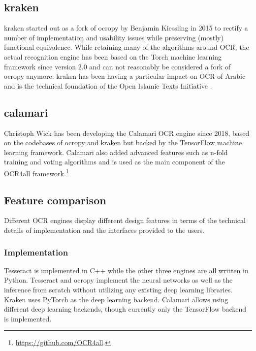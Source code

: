 \documentclass[conference]{IEEEtran}
\begin{document}
\subsection{kraken}

kraken \cite{DBLP:journals/corr/RomanovMSK17} started out as a fork of ocropy
by Benjamin Kiessling in 2015 to rectify a number of implementation and usability
issues while preserving (mostly) functional equivalence. While retaining many of
the algorithms around OCR, the actual recognition engine has been based on the
Torch machine learning framework since version 2.0 and can not reasonably be
considered a fork of ocropy anymore. kraken has been having a particular impact
on OCR of Arabic and is the technical foundation of the Open Islamic Texts
Initiative \cite{miller_romanov_savant_2018}.


\subsection{calamari}

Christoph Wick has been developing the Calamari
\cite{DBLP:journals/corr/abs-1807-02004} OCR engine since 2018, based on the
codebases of ocropy and kraken but backed by the TensorFlow machine learning
framework. Calamari also added advanced features such as n-fold training and
voting algorithms and is used as the main component of the OCR4all
framework.\footnote{\url{https://github.com/OCR4all}.}

\subsection{Feature comparison}


Different OCR engines display different design features in terms of the
technical details of implementation and the interfaces provided to the users.

\subsubsection{Implementation}

Tesseract is implemented in C++ while the
other three engines are all written in Python. Tesseract and ocropy
implement the neural networks as well as the inference from scratch without
utilizing any existing deep learning libraries. Kraken uses PyTorch as the
deep learning backend. Calamari allows using different deep learning backends,
though currently only the TensorFlow backend is implemented.
\end{document}
